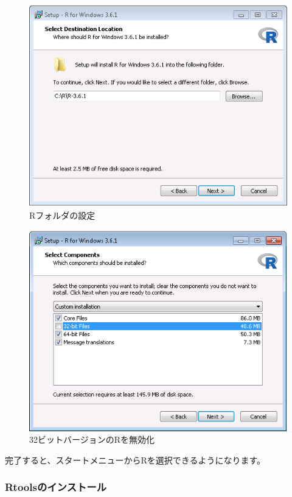 \documentclass[
  11pt]{book}
\theoremstyle{definition}
\theoremstyle{definition}
\theoremstyle{definition}
\theoremstyle{definition}
\theoremstyle{remark}
\begin{document}
\begin{figure}

{\centering \includegraphics[width=0.8\linewidth]{images/OhdsiAnalyticsTools/rDestination} 

}

\caption{Rフォルダの設定}\label{fig:rDestination}
\end{figure}

\begin{figure}

{\centering \includegraphics[width=0.8\linewidth]{images/OhdsiAnalyticsTools/no32Bits} 

}

\caption{32ビットバージョンのRを無効化}\label{fig:no32Bits}
\end{figure}

完了すると、スタートメニューからRを選択できるようになります。

\subsubsection*{Rtoolsのインストール}\label{rtoolsux306eux30a4ux30f3ux30b9ux30c8ux30fcux30eb}
\end{document}

